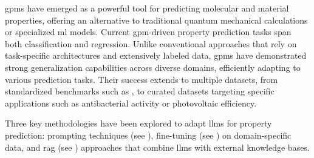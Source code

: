 \glspl{gpm} have emerged as a powerful tool for predicting molecular and material properties, offering an alternative to traditional quantum mechanical calculations or specialized \gls{ml} models. 
Current \gls{gpm}-driven property prediction tasks span both classification and regression. 
Unlike conventional approaches that rely on task-specific architectures and extensively labeled data, \glspl{gpm} have demonstrated strong generalization capabilities across diverse domains, efficiently adapting to various prediction tasks. 
Their success extends to multiple datasets, from standardized benchmarks such as  \autocite{wu2018moleculenet}, to curated datasets targeting specific applications such as antibacterial activity \autocite{chithrananda2020chemberta} or photovoltaic efficiency\autocite{aneesh2025semantic}.

Three key methodologies have been explored to adapt \glspl{llm} for property prediction: prompting techniques (see ), fine-tuning (see ) on domain-specific data, and \gls{rag} (see ) approaches that combine \glspl{llm} with external knowledge bases. 

